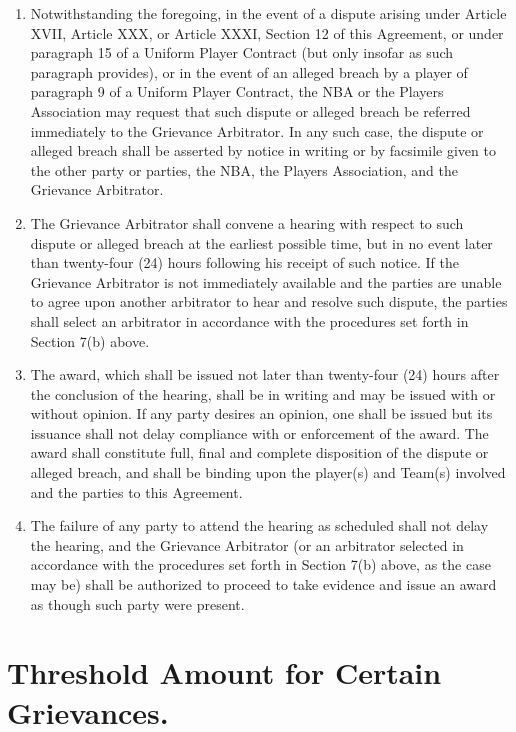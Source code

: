 \documentclass[
]{book}
\providecommand{\tightlist}{%
  \setlength{\itemsep}{0pt}\setlength{\parskip}{0pt}}
\begin{document}
\begin{enumerate}
\def\labelenumi{(\alph{enumi})}
\tightlist
\item
  Notwithstanding the foregoing, in the event of a dispute arising under Article XVII, Article XXX, or Article XXXI, Section 12 of this Agreement, or under paragraph 15 of a Uniform Player Contract (but only insofar as such paragraph provides), or in the event of an alleged breach by a player of paragraph 9 of a Uniform Player Contract, the NBA or the Players Association may request that such dispute or alleged breach be referred immediately to the Grievance Arbitrator. In any such case, the dispute or alleged breach shall be asserted by notice in writing or by facsimile given to the other party or parties, the NBA, the Players Association, and the Grievance Arbitrator.
\item
  The Grievance Arbitrator shall convene a hearing with respect to such dispute or alleged breach at the earliest possible time, but in no event later than twenty-four (24) hours following his receipt of such notice. If the Grievance Arbitrator is not immediately available and the parties are unable to agree upon another arbitrator to hear and resolve such dispute, the parties shall select an arbitrator in accordance with the procedures set forth in Section 7(b) above.
\item
  The award, which shall be issued not later than twenty-four (24) hours after the conclusion of the hearing, shall be in writing and may be issued with or without opinion. If any party desires an opinion, one shall be issued but its issuance shall not delay compliance with or enforcement of the award. The award shall constitute full, final and complete disposition of the dispute or alleged breach, and shall be binding upon the player(s) and Team(s) involved and the parties to this Agreement.
\item
  The failure of any party to attend the hearing as scheduled shall not delay the hearing, and the Grievance Arbitrator (or an arbitrator selected in accordance with the procedures set forth in Section 7(b) above, as the case may be) shall be authorized to proceed to take evidence and issue an award as though such party were present.
\end{enumerate}

\hypertarget{threshold-amount-for-certain-grievances.}{%
\section{Threshold Amount for Certain Grievances.}\label{threshold-amount-for-certain-grievances.}}
\end{document}
